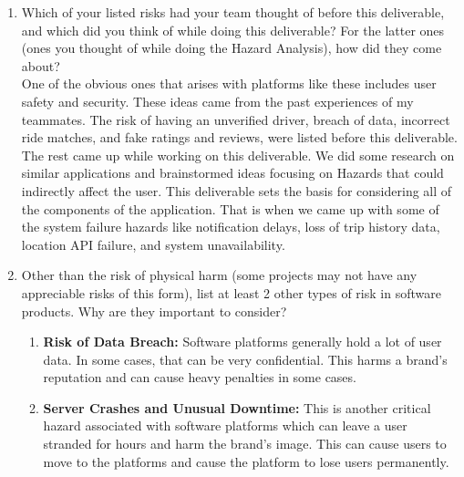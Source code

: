 \documentclass{article}
\begin{document}
\begin{enumerate}
    \item Which of your listed risks had your team thought of before this
    deliverable, and which did you think of while doing this deliverable? For
    the latter ones (ones you thought of while doing the Hazard Analysis), how
    did they come about?\\
    
   One of the obvious ones that arises with platforms like these includes user safety and security. These ideas came from the past experiences of my teammates. The risk of having an unverified driver, breach of data, incorrect ride matches, and fake ratings and reviews, were listed before this deliverable. The rest came up while working on this deliverable. We did some research on similar applications and brainstormed ideas focusing on Hazards that could indirectly affect the user. This deliverable sets the basis for considering all of the components of the application. That is when we came up with some of the system failure hazards like notification delays, loss of trip history data, location API failure, and system unavailability. 

    \item Other than the risk of physical harm (some projects may not have any
    appreciable risks of this form), list at least 2 other types of risk in
    software products. Why are they important to consider?\\
    \begin{enumerate}
    \item \textbf{Risk of Data Breach:} Software platforms generally hold a lot of user data. In some cases, that can be very confidential. This harms a brand's reputation and can cause heavy penalties in some cases.  
    \item \textbf{Server Crashes and Unusual Downtime:} This is another critical hazard associated with software platforms which can leave a user stranded for hours and harm the brand's image. This can cause users to move to the platforms and cause the platform to lose users permanently.  
\end{enumerate}



\end{enumerate}
\end{document}
